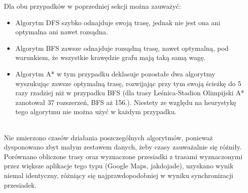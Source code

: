 \documentclass[12pt, polish]{article}
\begin{document}
Dla obu przypadków w poprzedniej sekcji można zauważyć:
\begin{itemize}
    \item Algorytm DFS szybko odnajduje swoją trasę, jednak nie jest ona ani optymalna ani nawet rozsądna.
    \item Algorytm BFS zawsze odnajduje rozsądną trasę, nawet optymalną, pod warunkiem, że wszystkie krawędzie grafu mają taką samą wagę.
    \item Algorytm A* w tym przypadku deklasuje pozostałe dwa algorytmy wyszukując zawsze optymalną trasę, rozwijając przy tym swoją ścieżkę do 5 razy rzadziej niż w przypadku BFS (dla trasy Leśnica-Stadion Olimpijski A* zanotował 37 rozszerzeń, BFS aż 156.). Niestety ze względu na heurystykę tego algorytmu nie można użyć w każdym przypadku.
\end{itemize}
\\
Nie zmierzono czasów działania poszczególnych algorytmów, ponieważ dysponowano zbyt małym zestawem danych, żeby czasy zauważalnie się różniły.
\\
Porównano obliczone trasy oraz wyznaczone przesiadki z trasami wyznaczonymi przez większe aplikacje tego typu (Google Maps, jakdojade), uzyskano wynik niemal identyczny, różniący się najprawdopodobniej w wyniku synchronizacji przesiadek.
\end{document}
